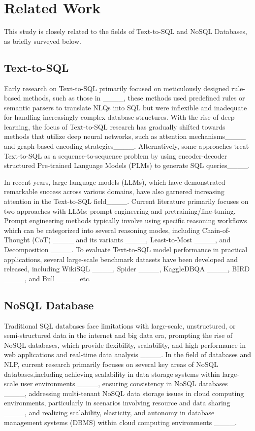 \section{Related Work}
This study is closely related to the fields of Text-to-SQL and NoSQL Databases, as briefly surveyed below.
\subsection{Text-to-SQL}
Early research on Text-to-SQL primarily focused on meticulously designed rule-based methods, such as those in ____, these methods used predefined rules or semantic parsers to translate NLQs into SQL but were inflexible and inadequate for handling increasingly complex database structures.
%
With the rise of deep learning, the focus of Text-to-SQL research has gradually shifted towards methods that utilize deep neural networks, such as attention mechanisms____  and graph-based encoding strategies____. Alternatively, some approaches treat Text-to-SQL as a sequence-to-sequence problem by using encoder-decoder structured Pre-trained Language Models (PLMs) to generate SQL queries____.

In recent years, large language models (LLMs), which have demonstrated remarkable success across various domains, have also garnered increasing attention in the Text-to-SQL field____. Current literature primarily focuses on two approaches with LLMs: prompt engineering and pretraining/fine-tuning. Prompt engineering methods typically involve using specific reasoning workflows which can be categorized into several reasoning modes, including Chain-of-Thought (CoT) ____ and its variants ____, Least-to-Most ____, and Decomposition ____. To evaluate Text-to-SQL model performance in practical applications, several large-scale benchmark datasets have been developed and released, including WikiSQL ____, Spider ____, KaggleDBQA ____, BIRD ____, and Bull ____ etc.

\subsection{NoSQL Database}


Traditional SQL databases face limitations with large-scale, unstructured, or semi-structured data in the internet and big data era, prompting the rise of NoSQL databases, which provide flexibility, scalability, and high performance in web applications and real-time data analysis ____.
%
In the field of databases and NLP, current research primarily focuses on several key areas of NoSQL databases,including achieving scalability in data storage systems within large-scale user environments ____, ensuring consistency in NoSQL databases ____, addressing multi-tenant NoSQL data storage issues in cloud computing environments, particularly in scenarios involving resource and data sharing ____, and realizing scalability, elasticity, and autonomy in database management systems (DBMS) within cloud computing environments ____.

